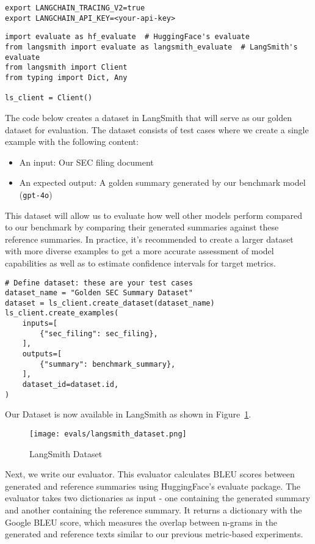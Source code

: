 \begin{verbatim}
export LANGCHAIN_TRACING_V2=true
export LANGCHAIN_API_KEY=<your-api-key>
\end{verbatim}

\begin{verbatim}
import evaluate as hf_evaluate  # HuggingFace's evaluate
from langsmith import evaluate as langsmith_evaluate  # LangSmith's evaluate
from langsmith import Client
from typing import Dict, Any

ls_client = Client()
\end{verbatim}

The code below creates a dataset in LangSmith that will serve as our golden dataset for evaluation. The dataset consists of test cases where we create a single example with the following content:

\begin{itemize}
\item An input: Our SEC filing document
\item An expected output: A golden summary generated by our benchmark model (\texttt{gpt-4o})
\end{itemize}

This dataset will allow us to evaluate how well other models perform compared to our benchmark by comparing their generated summaries against these reference summaries. In practice, it's recommended to create a larger dataset with more diverse examples to get a more accurate assessment of model capabilities as well as to estimate confidence intervals for target metrics.

\begin{verbatim}
# Define dataset: these are your test cases
dataset_name = "Golden SEC Summary Dataset"
dataset = ls_client.create_dataset(dataset_name)
ls_client.create_examples(
    inputs=[
        {"sec_filing": sec_filing},
    ],
    outputs=[
        {"summary": benchmark_summary},
    ],
    dataset_id=dataset.id,
)
\end{verbatim}
Our Dataset is now available in LangSmith as shown in Figure~\ref{fig:langsmith_dataset}.
\begin{figure}[h]
\centering
\texttt{[image: evals/langsmith\_dataset.png]}
\label{fig:langsmith_dataset}
\caption{LangSmith Dataset}
\end{figure}

Next, we write our evaluator. This evaluator calculates BLEU scores between generated and reference summaries using HuggingFace's evaluate package. The evaluator takes two dictionaries as input - one containing the generated summary and another containing the reference summary. It returns a dictionary with the Google BLEU score, which measures the overlap between n-grams in the generated and reference texts similar to our previous metric-based experiments.

